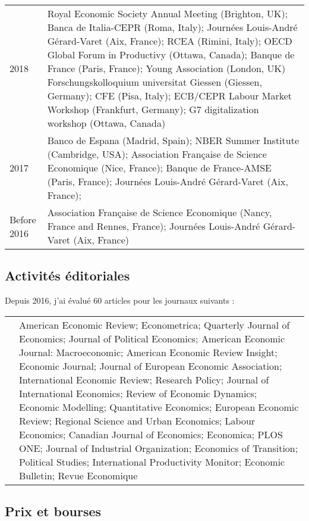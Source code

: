 \documentclass[12pt]{article}
\begin{document}
\begin{footnotesize}
\begin{tabular}{p{1cm}p{13cm}}
 2018 &  Royal Economic Society Annual Meeting (Brighton, UK); Banca de Italia-CEPR (Roma, Italy); Journées Louis-André Gérard-Varet (Aix, France); RCEA (Rimini, Italy); OECD Global Forum in Productivy (Ottawa, Canada); Banque de France (Paris, France); Young Association (London, UK)  Forschungskolloquium universitat Giessen (Giessen, Germany);  CFE (Pisa, Italy); ECB/CEPR Labour Market Workshop (Frankfurt, Germany); G7 digitalization workshop (Ottawa, Canada)\\
 2017 & Banco de Espana (Madrid, Spain); NBER Summer Institute (Cambridge, USA); Association Française de Science Economique (Nice, France); Banque de France-AMSE (Paris, France); Journées Louis-André Gérard-Varet (Aix, France);\\
 Before 2016 & Association Française de Science Economique (Nancy, France and Rennes, France); Journées Louis-André Gérard-Varet (Aix, France) 
 \end{tabular}
\end{footnotesize}

\subsection*{Activités éditoriales}

Depuis 2016, j'ai évalué 60 articles pour les journaux suivants : 

\begin{footnotesize}
\begin{tabular}{p{1cm}p{13cm}}
& American Economic Review; Econometrica; Quarterly Journal of Economics; Journal of Political Economics; American Economic Journal: Macroeconomic; American Economic Review Insight; Economic Journal; Journal of European Economic Association; International Economic Review; Research Policy; Journal of International Economics; Review of Economic Dynamics; Economic Modelling; Quantitative Economics; European Economic Review; Regional Science and Urban Economics; Labour Economics; Canadian Journal of Economics; Economica; PLOS ONE; Journal of Industrial Organization; Economics of Transition; Political Studies;  International Productivity Monitor; Economic Bulletin; Revue Economique \\
\end{tabular}
\end{footnotesize}

\subsection*{Prix et bourses}
\end{document}
